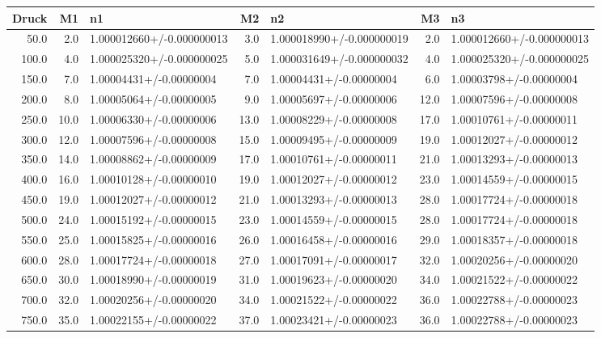 \begin{tabular}{rrlrlrl}
\toprule
  Druck &    M1 &                         n1 &    M2 &                         n2 &    M3 &                         n3 \\
\midrule
   50.0 &   2.0 &  1.000012660+/-0.000000013 &   3.0 &  1.000018990+/-0.000000019 &   2.0 &  1.000012660+/-0.000000013 \\
  100.0 &   4.0 &  1.000025320+/-0.000000025 &   5.0 &  1.000031649+/-0.000000032 &   4.0 &  1.000025320+/-0.000000025 \\
  150.0 &   7.0 &    1.00004431+/-0.00000004 &   7.0 &    1.00004431+/-0.00000004 &   6.0 &    1.00003798+/-0.00000004 \\
  200.0 &   8.0 &    1.00005064+/-0.00000005 &   9.0 &    1.00005697+/-0.00000006 &  12.0 &    1.00007596+/-0.00000008 \\
  250.0 &  10.0 &    1.00006330+/-0.00000006 &  13.0 &    1.00008229+/-0.00000008 &  17.0 &    1.00010761+/-0.00000011 \\
  300.0 &  12.0 &    1.00007596+/-0.00000008 &  15.0 &    1.00009495+/-0.00000009 &  19.0 &    1.00012027+/-0.00000012 \\
  350.0 &  14.0 &    1.00008862+/-0.00000009 &  17.0 &    1.00010761+/-0.00000011 &  21.0 &    1.00013293+/-0.00000013 \\
  400.0 &  16.0 &    1.00010128+/-0.00000010 &  19.0 &    1.00012027+/-0.00000012 &  23.0 &    1.00014559+/-0.00000015 \\
  450.0 &  19.0 &    1.00012027+/-0.00000012 &  21.0 &    1.00013293+/-0.00000013 &  28.0 &    1.00017724+/-0.00000018 \\
  500.0 &  24.0 &    1.00015192+/-0.00000015 &  23.0 &    1.00014559+/-0.00000015 &  28.0 &    1.00017724+/-0.00000018 \\
  550.0 &  25.0 &    1.00015825+/-0.00000016 &  26.0 &    1.00016458+/-0.00000016 &  29.0 &    1.00018357+/-0.00000018 \\
  600.0 &  28.0 &    1.00017724+/-0.00000018 &  27.0 &    1.00017091+/-0.00000017 &  32.0 &    1.00020256+/-0.00000020 \\
  650.0 &  30.0 &    1.00018990+/-0.00000019 &  31.0 &    1.00019623+/-0.00000020 &  34.0 &    1.00021522+/-0.00000022 \\
  700.0 &  32.0 &    1.00020256+/-0.00000020 &  34.0 &    1.00021522+/-0.00000022 &  36.0 &    1.00022788+/-0.00000023 \\
  750.0 &  35.0 &    1.00022155+/-0.00000022 &  37.0 &    1.00023421+/-0.00000023 &  36.0 &    1.00022788+/-0.00000023 \\

\end{tabular}
